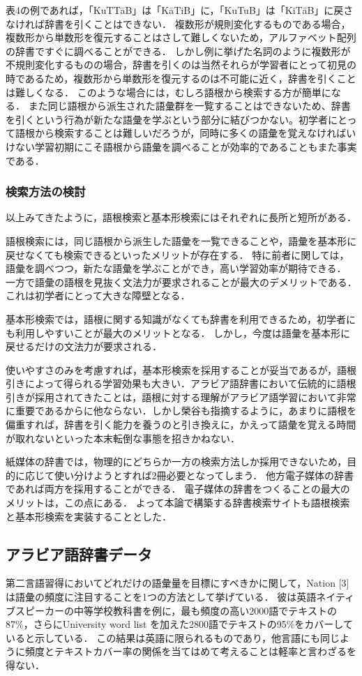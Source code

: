 \documentclass[technicalreport]{ieicej}
\begin{document}
表4の例であれば，「KuTTāB」は「KāTiB」に，「KuTuB」は「KiTāB」に戻さなければ辞書を引くことはできない．
複数形が規則変化するものである場合，複数形から単数形を復元することはさして難しくないため，アルファベット配列の辞書ですぐに調べることができる．
しかし例に挙げた名詞のように複数形が不規則変化するものの場合，辞書を引くのは当然それらが学習者にとって初見の時であるため，複数形から単数形を復元するのは不可能に近く，辞書を引くことは難しくなる．
このような場合には，むしろ語根から検索する方が簡単になる．
また同じ語根から派生された語彙群を一覧することはできないため、辞書を引くという行為が新たな語彙を学ぶという部分に結びつかない。初学者にとって語根から検索することは難しいだろうが，同時に多くの語彙を覚えなければいけない学習初期にこそ語根から語彙を調べることが効率的であることもまた事実である．

\subsubsection{検索方法の検討}
以上みてきたように，語根検索と基本形検索にはそれぞれに長所と短所がある．

語根検索には，同じ語根から派生した語彙を一覧できることや，語彙を基本形に戻せなくても検索できるといったメリットが存在する．
特に前者に関しては，語彙を調べつつ，新たな語彙を学ぶことができ，高い学習効率が期待できる．
一方で語彙の語根を見抜く文法力が要求されることが最大のデメリットである．
これは初学者にとって大きな障壁となる．

基本形検索では，語根に関する知識がなくても辞書を利用できるため，初学者にも利用しやすいことが最大のメリットとなる．
しかし，今度は語彙を基本形に戻せるだけの文法力が要求される．

使いやすさのみを考慮すれば，基本形検索を採用することが妥当であるが，語根引きによって得られる学習効果も大きい．アラビア語辞書において伝統的に語根引きが採用されてきたことは，語根に対する理解がアラビア語学習において非常に重要であるからに他ならない．しかし榮谷\cite{sakaedani2008}も指摘するように，あまりに語根を偏重すれば，辞書を引く能力を養うのと引き換えに，かえって語彙を覚える時間が取れないといった本末転倒な事態を招きかねない．

紙媒体の辞書では，物理的にどちらか一方の検索方法しか採用できないため，目的に応じて使い分けようとすれば2冊必要となってしまう．
他方電子媒体の辞書であれば両方を採用することができる．
電子媒体の辞書をつくることの最大のメリットは，この点にある．
よって本論で構築する辞書検索サイトも語根検索と基本形検索を実装することとした．

\subsection{アラビア語辞書データ}
第二言語習得においてどれだけの語彙量を目標にすべきかに関して，Nation [3]は語彙の頻度に注目することを1つの方法として挙げている．
彼は英語ネイティブスピーカーの中等学校教科書を例に，最も頻度の高い2000語でテキストの87\%，さらにUniversity word list を加えた2800語でテキストの95\%をカバーしていると示している．
この結果は英語に限られるものであり，他言語にも同じように頻度とテキストカバー率の関係を当てはめて考えることは軽率と言わざるを得ない．
\end{document}
